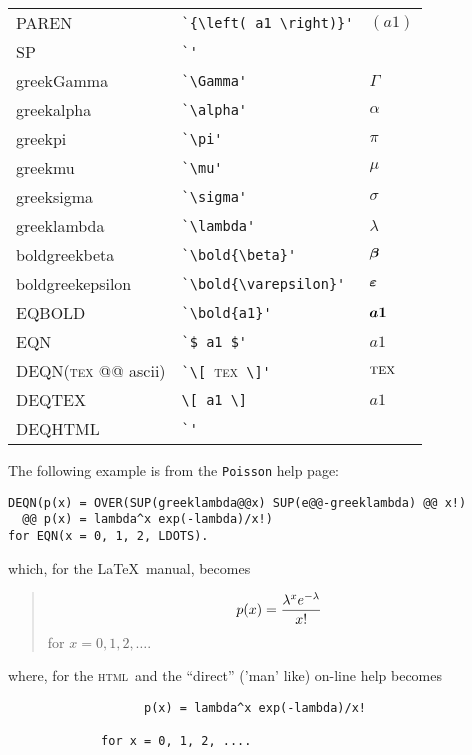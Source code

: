\documentclass[a4paper,11pt]{article}
\newenvironment{display}[0]%
 {\begin{list}{}{\setlength{\leftmargin}{30pt}}\item}%
 {\end{list}}
\newcommand{\bold}[1]{\mbox{\boldmath $#1$}}
\newcommand{\HTML}{\textsc{html}}
\begin{document}
\begin{center}
\begin{tabular}{l@{\ \ $\to$\ \ }p{12em}@{\ \ $\longrightarrow$\ \ }l}
PAREN           & \verb#`{\left( a1 \right)}'#  & $ {\left( a1 \right)} $ \\
SP              & \verb#`'#     & $  $ \\
\hline
greekGamma      & \verb#`\Gamma'#       & $ \Gamma $ \\
greekalpha      & \verb#`\alpha'#       & $ \alpha $ \\
greekpi         & \verb#`\pi'#  & $ \pi $ \\
greekmu         & \verb#`\mu'#  & $ \mu $ \\
greeksigma      & \verb#`\sigma'#       & $ \sigma $ \\
greeklambda     & \verb#`\lambda'#      & $ \lambda $ \\
boldgreekbeta   & \verb#`\bold{\beta}'#         & $ \bold{\beta} $ \\
boldgreekepsilon& \verb#`\bold{\varepsilon}'#   & $ \bold{\varepsilon} $ \\
\hline\hline
EQBOLD          & \verb#`\bold{a1}'#    & $ \bold{a1} $ \\
EQN             & \verb#`$ a1 $'#       & $  a1  $ \\
DEQN(\textsc{tex} @@ ascii) & \verb#`\[ #\textsc{tex}\verb# \]'#
                                        &  $\displaystyle \textsc{tex} $  \\
DEQTEX          & \verb#\[ a1 \]#       &  $\displaystyle a1 $  \\
DEQHTML         & \verb#`'#     & $  $ \\ \hline
\end{tabular}
\end{center}

\bigskip

\noindent The following example is from the \texttt{Poisson} help page:
\begin{display}
\begin{verbatim}
DEQN(p(x) = OVER(SUP(greeklambda@@x) SUP(e@@-greeklambda) @@ x!)
  @@ p(x) = lambda^x exp(-lambda)/x!)
for EQN(x = 0, 1, 2, LDOTS).
\end{verbatim}
\end{display}
which, for the \LaTeX\ manual, becomes
\begin{quote}
\[ p(x) = {{{{\lambda}^{x}} {{e}^{-\lambda}}} \over {x!}}
 \]
for $ x = 0, 1, 2, \ldots $.
\end{quote}
where, for the \HTML\ and  the ``direct'' ('man' like) on-line help becomes
\begin{verbatim}
                   p(x) = lambda^x exp(-lambda)/x!
        
             for x = 0, 1, 2, ....
\end{verbatim}
        
\end{document}
